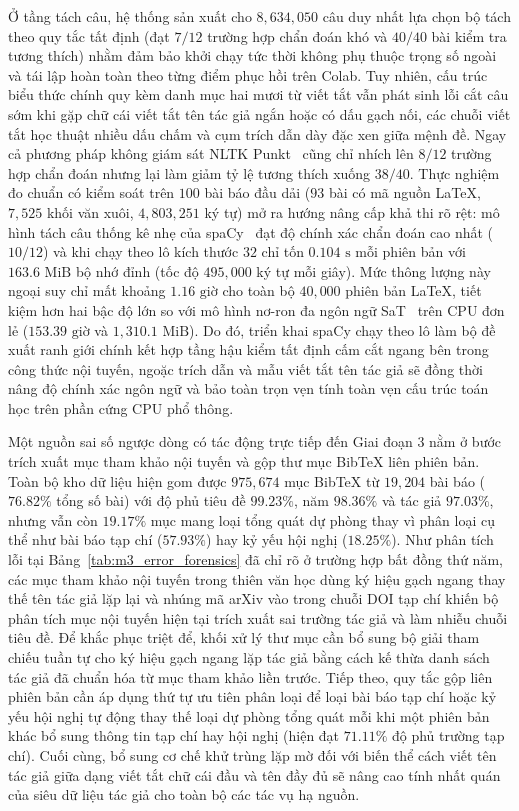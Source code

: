 Ở tầng tách câu, hệ thống sản xuất cho $8{,}634{,}050$ câu duy nhất lựa chọn bộ tách theo quy tắc tất định (đạt $7/12$ trường hợp chẩn đoán khó và $40/40$ bài kiểm tra tương thích) nhằm đảm bảo khởi chạy tức thời không phụ thuộc trọng số ngoài và tái lập hoàn toàn theo từng điểm phục hồi trên Colab. Tuy nhiên, cấu trúc biểu thức chính quy kèm danh mục hai mươi từ viết tắt vẫn phát sinh lỗi cắt câu sớm khi gặp chữ cái viết tắt tên tác giả ngắn hoặc có dấu gạch nối, các chuỗi viết tắt học thuật nhiều dấu chấm và cụm trích dẫn dày đặc xen giữa mệnh đề. Ngay cả phương pháp không giám sát NLTK Punkt~\cite{kiss2006} cũng chỉ nhích lên $8/12$ trường hợp chẩn đoán nhưng lại làm giảm tỷ lệ tương thích xuống $38/40$. Thực nghiệm đo chuẩn có kiểm soát trên $100$ bài báo đầu dải ($93$ bài có mã nguồn LaTeX, $7{,}525$ khối văn xuôi, $4{,}803{,}251$ ký tự) mở ra hướng nâng cấp khả thi rõ rệt: mô hình tách câu thống kê nhẹ của spaCy~\cite{spacy} đạt độ chính xác chẩn đoán cao nhất ($10/12$) và khi chạy theo lô kích thước $32$ chỉ tốn $0.104\text{ s}$ mỗi phiên bản với $163.6\text{ MiB}$ bộ nhớ đỉnh (tốc độ $495{,}000$ ký tự mỗi giây). Mức thông lượng này ngoại suy chỉ mất khoảng $1.16\text{ giờ}$ cho toàn bộ $40{,}000$ phiên bản LaTeX, tiết kiệm hơn hai bậc độ lớn so với mô hình nơ-ron đa ngôn ngữ SaT~\cite{frohmann2024} trên CPU đơn lẻ ($153.39\text{ giờ}$ và $1{,}310.1\text{ MiB}$). Do đó, triển khai spaCy chạy theo lô làm bộ đề xuất ranh giới chính kết hợp tầng hậu kiểm tất định cấm cắt ngang bên trong công thức nội tuyến, ngoặc trích dẫn và mẫu viết tắt tên tác giả sẽ đồng thời nâng độ chính xác ngôn ngữ và bảo toàn trọn vẹn tính toàn vẹn cấu trúc toán học trên phần cứng CPU phổ thông.

Một nguồn sai số ngược dòng có tác động trực tiếp đến Giai đoạn 3 nằm ở bước trích xuất mục tham khảo nội tuyến và gộp thư mục BibTeX liên phiên bản. Toàn bộ kho dữ liệu hiện gom được $975{,}674$ mục BibTeX từ $19{,}204$ bài báo ($76.82\%$ tổng số bài) với độ phủ tiêu đề $99.23\%$, năm $98.36\%$ và tác giả $97.03\%$, nhưng vẫn còn $19.17\%$ mục mang loại tổng quát dự phòng thay vì phân loại cụ thể như bài báo tạp chí ($57.93\%$) hay kỷ yếu hội nghị ($18.25\%$). Như phân tích lỗi tại Bảng~\ref{tab:m3_error_forensics} đã chỉ rõ ở trường hợp bất đồng thứ năm, các mục tham khảo nội tuyến trong thiên văn học dùng ký hiệu gạch ngang thay thế tên tác giả lặp lại và nhúng mã arXiv vào trong chuỗi DOI tạp chí khiến bộ phân tích mục nội tuyến hiện tại trích xuất sai trường tác giả và làm nhiễu chuỗi tiêu đề. Để khắc phục triệt để, khối xử lý thư mục cần bổ sung bộ giải tham chiếu tuần tự cho ký hiệu gạch ngang lặp tác giả bằng cách kế thừa danh sách tác giả đã chuẩn hóa từ mục tham khảo liền trước. Tiếp theo, quy tắc gộp liên phiên bản cần áp dụng thứ tự ưu tiên phân loại để loại bài báo tạp chí hoặc kỷ yếu hội nghị tự động thay thế loại dự phòng tổng quát mỗi khi một phiên bản khác bổ sung thông tin tạp chí hay hội nghị (hiện đạt $71.11\%$ độ phủ trường tạp chí). Cuối cùng, bổ sung cơ chế khử trùng lặp mờ đối với biến thể cách viết tên tác giả giữa dạng viết tắt chữ cái đầu và tên đầy đủ sẽ nâng cao tính nhất quán của siêu dữ liệu tác giả cho toàn bộ các tác vụ hạ nguồn.

